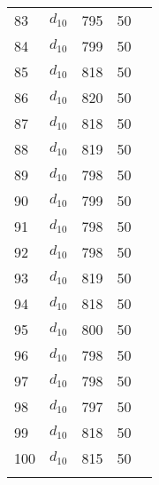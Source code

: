 \documentclass[11pt,a4paper]{article}
\begin{document}
\begin{longtable}[]{@{}lllll@{}}
    83 & $d_{10}$ & 795 & 50 \tabularnewline
    84 & $d_{10}$ & 799 & 50 \tabularnewline
    85 & $d_{10}$ & 818 & 50 \tabularnewline
    86 & $d_{10}$ & 820 & 50 \tabularnewline
    87 & $d_{10}$ & 818 & 50 \tabularnewline
    88 & $d_{10}$ & 819 & 50 \tabularnewline
    89 & $d_{10}$ & 798 & 50 \tabularnewline
    90 & $d_{10}$ & 799 & 50 \tabularnewline
    91 & $d_{10}$ & 798 & 50 \tabularnewline
    92 & $d_{10}$ & 798 & 50 \tabularnewline
    93 & $d_{10}$ & 819 & 50 \tabularnewline
    94 & $d_{10}$ & 818 & 50 \tabularnewline
    95 & $d_{10}$ & 800 & 50 \tabularnewline
    96 & $d_{10}$ & 798 & 50 \tabularnewline
    97 & $d_{10}$ & 798 & 50 \tabularnewline
    98 & $d_{10}$ & 797 & 50 \tabularnewline
    99 & $d_{10}$ & 818 & 50 \tabularnewline
    100 & $d_{10}$ & 815 & 50 \tabularnewline
    \bottomrule
    \label{output3}
\end{longtable}
\end{document}

